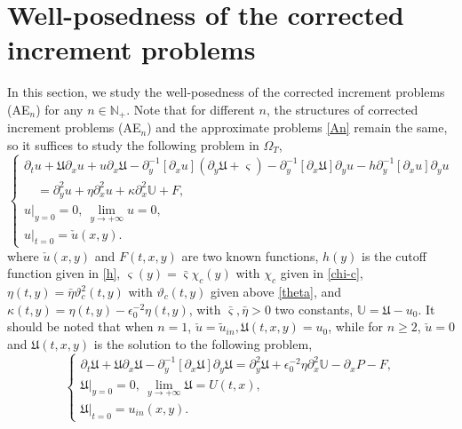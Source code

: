 \documentclass{amsart}
\numberwithin{equation}{section}
\begin{document}
\section{Well-posedness of the corrected increment problems }

In this section, we study the well-posedness of the corrected increment  problems (AE$_{n}$) for any $n\in\mathbb{N}_{+}$.
Note that for different $n$, the structures of corrected increment problems (AE$_{n}$) and the approximate problems \eqref{An} remain the same, so it suffices to study the following problem in $\Omega_{T}$,
\begin{equation}\label{app}
\begin{cases}
\partial_{t}u
+\mathfrak{U}\partial_{x}u+u\partial_{x}\mathfrak{U}
-\partial_{y}^{-1}[\partial_{x}u](\partial_{y}\mathfrak{U}+\varsigma)
-\partial_{y}^{-1}[\partial_{x}\mathfrak{U}]\partial_{y}u
-h\partial_{y}^{-1}[\partial_{x}u]\partial_{y}u\\
\quad
=\partial_{y}^{2}u+\eta\partial_{x}^{2}u+\kappa\partial_{x}^{2}\mathbb{U}+F,\\
u|_{y=0}=0,~\lim\limits_{y\to+\infty} u=0,\\
u|_{t=0}=\check{u}(x,y).
\end{cases}
\end{equation}
where $\check{u}(x,y)$ and $F(t,x,y)$ are two known functions, $h(y)$ is the cutoff function given in \eqref{h},  $\varsigma(y)=\bar{\varsigma}\chi_{c}(y)$ with $\chi_c$ given in \eqref{chi-c}, $\eta(t,y)=\bar{\eta}\vartheta_{c}^{2}(t,y)$ with $\vartheta_{c}(t,y)$ given above \eqref{theta}, and $\kappa(t,y)=\eta(t,y)-\epsilon_{0}^{-2}\eta(t,y)$,
with $\bar{\varsigma}, \bar{\eta}>0$ two constants,  $\mathbb{U}=\mathfrak{U}-u_{0}$. It should be noted that when $n=1$, $\check{u}=\tilde{u}_{in}, \mathfrak{U}(t,x,y)=u_{0}$, while for $n\geq 2$, $\check{u}=0$ and $\mathfrak{U}(t,x,y)$ is the solution to the following problem,
\begin{equation}\label{App}
\begin{cases}
\partial_{t}\mathfrak{U}
+\mathfrak{U}\partial_{x}\mathfrak{U}
-\partial_{y}^{-1}[\partial_{x}\mathfrak{U}]\partial_{y}\mathfrak{U}
=\partial_{y}^{2}\mathfrak{U}+\epsilon_{0}^{-2}\eta\partial_{x}^{2}\mathbb{U}-\partial_{x}P-F,\\
\mathfrak{U}|_{y=0}=0,~\lim\limits_{y\to+\infty}\mathfrak{U}=U(t,x),\\
\mathfrak{U}|_{t=0}=u_{in}(x,y).
\end{cases}
\end{equation}
\end{document}
